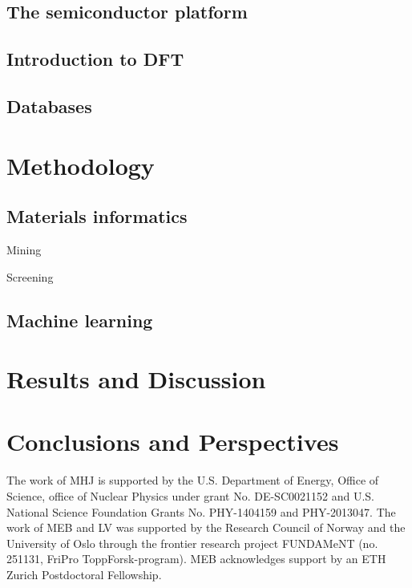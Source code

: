 \documentclass[superscriptaddress,unsortedaddress,
 amsmath,amssymb,
 aps,
]{revtex4-2}
\begin{document}
\subsection{The semiconductor platform}

\subsection{Introduction to DFT} 

\subsection{Databases} 

\section{Methodology}
\subsection{Materials informatics} 
Mining 

Screening 

\subsection{Machine learning} 


\section{Results and Discussion}
\subsection{}

\section{Conclusions and Perspectives}


\begin{acknowledgments}

The work of MHJ is supported by the U.S. Department of Energy,
Office of Science, office of Nuclear Physics under grant
No. DE-SC0021152 and U.S. National Science Foundation Grants
No. PHY-1404159 and PHY-2013047. 
The work of MEB and LV was supported by the Research Council of Norway and the University of Oslo through the frontier research project FUNDAMeNT (no. 251131, FriPro ToppForsk-program). 
MEB acknowledges support by an ETH Zurich Postdoctoral Fellowship. 

\end{acknowledgments}

\end{document}

